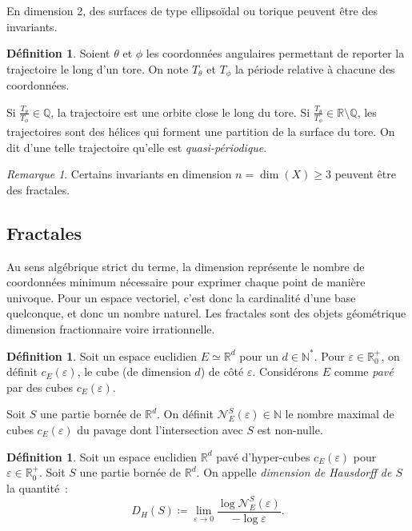 \documentclass{article}
\theoremstyle{definition}
\newtheorem{déf}[thm]{Définition}
\theoremstyle{remark}
\newtheorem*{rmq}{Remarque}
\newcommand{\N}{\mathbb N}
\newcommand{\Q}{\mathbb Q}
\newcommand{\R}{\mathbb R}
\begin{document}
	En dimension 2, des surfaces de type ellipsoïdal ou torique peuvent être des invariants.

	\begin{déf} Soient $\theta$ et $\phi$ les coordonnées angulaires permettant de reporter la trajectoire le long d'un tore. On note $T_\theta$ et $T_\phi$
	la période relative à chacune des coordonnées.

	Si $\frac {T_\theta}{T_\phi} \in \Q$, la trajectoire est une orbite close le long du tore. Si $\frac {T_\theta}{T_\phi} \in \R \setminus \Q$, les
	trajectoires sont des hélices qui forment une partition de la surface du tore. On dit d'une telle trajectoire qu'elle est \textit{quasi-périodique}.
	\end{déf}

	\begin{rmq} Certains invariants en dimension $n = \dim(X) \geq 3$ peuvent être des fractales.
	\end{rmq}

	\subsection{Fractales}

	Au sens algébrique strict du terme, la dimension représente le nombre de coordonnées minimum nécessaire pour exprimer chaque point de manière univoque.
	Pour un espace vectoriel, c'est donc la cardinalité d'une base quelconque, et donc un nombre naturel. Les fractales sont des objets géométrique dimension
	fractionnaire voire irrationnelle.

	\begin{déf} Soit un espace euclidien $E \simeq \R^d$ pour un $d \in \N^*$. Pour $\varepsilon \in \R_0^+$, on définit $c_E(\varepsilon)$, le cube (de dimension
	$d$) de côté $\varepsilon$. Considérons $E$ comme \textit{pavé} par des cubes $c_E(\varepsilon)$.

	Soit $S$ une partie bornée de $\R^d$. On définit $\mathcal N_E^S(\varepsilon) \in \N$ le nombre maximal de cubes $c_E(\varepsilon)$ du pavage dont
	l'intersection avec $S$ est non-nulle.
	\end{déf}

	\begin{déf} Soit un espace euclidien $\R^d$ pavé d'hyper-cubes $c_E(\varepsilon)$ pour $\varepsilon \in \R_0^+$. Soit $S$ une partie bornée de $\R^d$.
	On appelle \textit{dimension de Hausdorff de $S$} la quantité~:
	\[D_H(S) \coloneqq \lim_{\varepsilon \to 0}\frac {\log \mathcal N_E^S(\varepsilon)}{-\log\varepsilon}.\]
	\end{déf}
\end{document}
